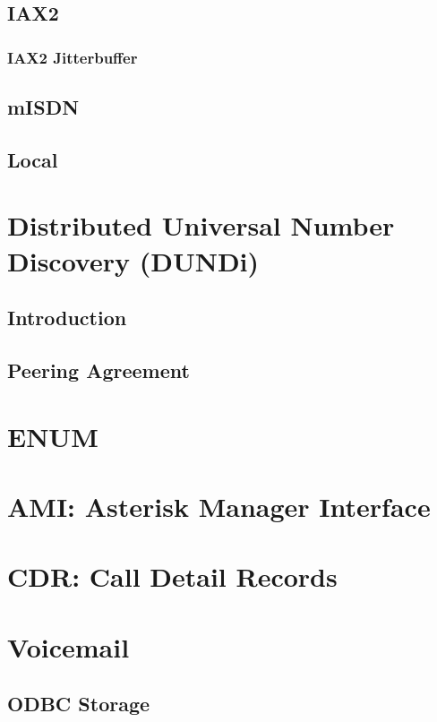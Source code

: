 \documentclass[12pt,a4]{report}
\begin{document}
  \section{IAX2}
  
    \subsection{IAX2 Jitterbuffer}
    
  \section{mISDN}
  
  \section{Local}
  

\chapter{Distributed Universal Number Discovery (DUNDi)}
  \section{Introduction}
  
  \section{Peering Agreement}
  

\chapter{ENUM}


\chapter{AMI: Asterisk Manager Interface}
  
  

\chapter{CDR: Call Detail Records}



\chapter{Voicemail}
  \section{ODBC Storage}
  \label{odbcstorage}
  
\end{document}
